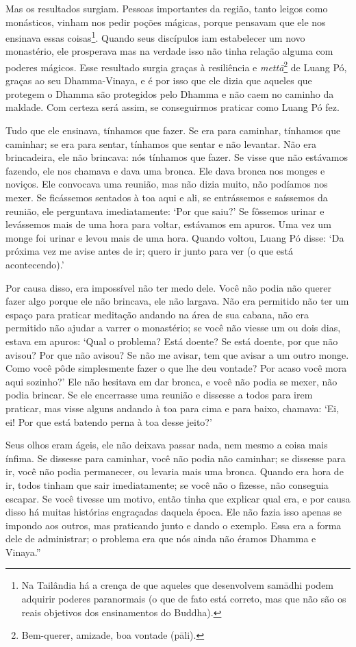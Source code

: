 Mas os resultados surgiam. Pessoas importantes da região, tanto leigos
como monásticos, vinham nos pedir poções mágicas, porque pensavam que
ele nos ensinava essas coisas\footnote{Na Tailândia há a crença de que
  aqueles que desenvolvem samādhi podem adquirir poderes paranormais (o
  que de fato está correto, mas que não são os reais objetivos dos
  ensinamentos do Buddha).}. Quando seus discípulos iam estabelecer um
novo monastério, ele prosperava mas na verdade isso não tinha relação
alguma com poderes mágicos. Esse resultado surgia graças à resiliência e
\emph{mettā}\footnote{Bem-querer, amizade, boa vontade (pāli).} de Luang
Pó, graças ao seu Dhamma-Vinaya, e é por isso que ele dizia que aqueles
que protegem o Dhamma são protegidos pelo Dhamma e não caem no caminho
da maldade. Com certeza será assim, se conseguirmos praticar como Luang
Pó fez.

Tudo que ele ensinava, tínhamos que fazer. Se era para caminhar,
tínhamos que caminhar; se era para sentar, tínhamos que sentar e não
levantar. Não era brincadeira, ele não brincava: nós tínhamos que fazer.
Se visse que não estávamos fazendo, ele nos chamava e dava uma bronca.
Ele dava bronca nos monges e noviços. Ele convocava uma reunião, mas não
dizia muito, não podíamos nos mexer. Se ficássemos sentados à toa aqui e
ali, se entrássemos e saíssemos da reunião, ele perguntava
imediatamente: `Por que saiu?' Se fôssemos urinar e levássemos mais de
uma hora para voltar, estávamos em apuros. Uma vez um monge foi urinar e
levou mais de uma hora. Quando voltou, Luang Pó disse: `Da próxima vez
me avise antes de ir; quero ir junto para ver (o que está acontecendo).'

Por causa disso, era impossível não ter medo dele. Você não podia não
querer fazer algo porque ele não brincava, ele não largava. Não era
permitido não ter um espaço para praticar meditação andando na área de
sua cabana, não era permitido não ajudar a varrer o monastério; se você
não viesse um ou dois dias, estava em apuros: `Qual o problema? Está
doente? Se está doente, por que não avisou? Por que não avisou? Se não
me avisar, tem que avisar a um outro monge. Como você pôde simplesmente
fazer o que lhe deu vontade? Por acaso você mora aqui sozinho?' Ele não
hesitava em dar bronca, e você não podia se mexer, não podia brincar. Se
ele encerrasse uma reunião e dissesse a todos para irem praticar, mas
visse alguns andando à toa para cima e para baixo, chamava: `Ei, ei! Por
que está batendo perna à toa desse jeito?'

Seus olhos eram ágeis, ele não deixava passar nada, nem mesmo a coisa
mais ínfima. Se dissesse para caminhar, você não podia não caminhar; se
dissesse para ir, você não podia permanecer, ou levaria mais uma bronca.
Quando era hora de ir, todos tinham que sair imediatamente; se você não
o fizesse, não conseguia escapar. Se você tivesse um motivo, então tinha
que explicar qual era, e por causa disso há muitas histórias engraçadas
daquela época. Ele não fazia isso apenas se impondo aos outros, mas
praticando junto e dando o exemplo. Essa era a forma dele de
administrar; o problema era que nós ainda não éramos Dhamma e Vinaya.''

